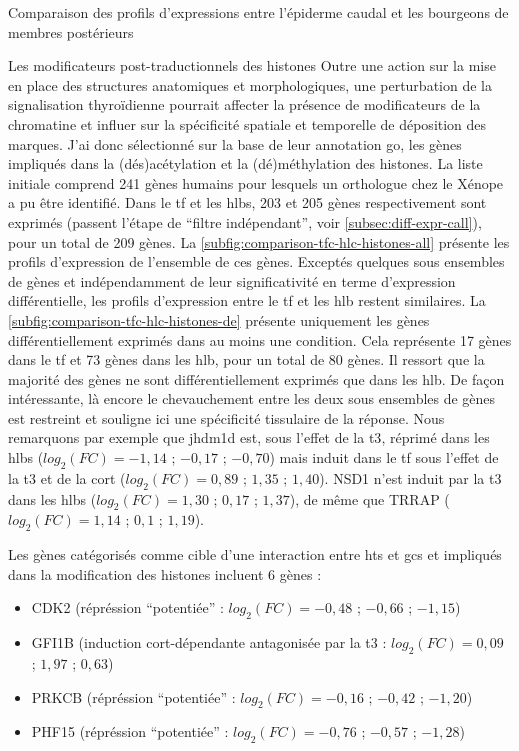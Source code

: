 \documentclass[../main.tex]{subfiles}
\begin{document}
\begin{chapter}{Comparaison des profils d'expressions entre l'épiderme caudal et les bourgeons de membres postérieurs}
\begin{section}{Les modificateurs post-traductionnels des histones}
Outre une action sur la mise en place des structures anatomiques et morphologiques, une perturbation de la signalisation thyroïdienne pourrait affecter la présence de modificateurs de la chromatine et influer sur la spécificité spatiale et temporelle de déposition des marques.
J'ai donc sélectionné sur la base de leur annotation \gls{go}, les gènes impliqués dans la (dés)acétylation et la (dé)méthylation des histones.
La liste initiale comprend 241 gènes humains pour lesquels un orthologue chez le Xénope a pu être identifié.
Dans le \gls{tf} et les \glspl{hlb}, 203 et 205 gènes respectivement sont exprimés (passent l'étape de ``filtre indépendant'', voir \autoref{subsec:diff-expr-call}), pour un total de 209 gènes.
La \autoref{subfig:comparison-tfc-hlc-histones-all} présente les profils d'expression de l'ensemble de ces gènes.
Exceptés quelques sous ensembles de gènes et indépendamment de leur significativité en terme d'expression différentielle, les profils d'expression entre le \gls{tf} et les \gls{hlb} restent similaires.
La \autoref{subfig:comparison-tfc-hlc-histones-de} présente uniquement les gènes différentiellement exprimés dans au moins une condition.
Cela représente 17 gènes dans le \gls{tf} et 73 gènes dans les \gls{hlb}, pour un total de 80 gènes.
Il ressort que la majorité des gènes ne sont différentiellement exprimés que dans les \gls{hlb}.
De façon intéressante, là encore le chevauchement entre les deux sous ensembles de gènes est restreint et souligne ici une spécificité tissulaire de la réponse.
Nous remarquons par exemple que \gls{jhdm1d} est, sous l'effet de la \gls{t3}, réprimé dans les \glspl{hlb} ($log_2(FC)=-1,14$ ; $-0,17$ ; $-0,70$) mais induit dans le \gls{tf} sous l'effet de la \gls{t3} et de la \gls{cort} ($log_2(FC)=0,89$ ; $1,35$ ; $1,40$).
NSD1 n'est induit par la \gls{t3} dans les \glspl{hlb} ($log_2(FC)=1,30$ ; $0,17$ ; $1,37$), de même que TRRAP ($log_2(FC)=1,14$ ; $0,1$ ; $1,19$).
\par
Les gènes catégorisés comme cible d'une interaction entre \glspl{ht} et \glspl{gc} et impliqués dans la modification des histones incluent 6 gènes :
\begin{itemize}
\item CDK2 (répréssion ``potentiée'' : $log_2(FC)=-0,48$ ; $-0,66$ ; $-1,15$)
\item GFI1B (induction \gls{cort}-dépendante antagonisée par la \gls{t3} : $log_2(FC)=0,09$ ; $1,97$ ; $0,63$)
\item PRKCB (répréssion ``potentiée'' : $log_2(FC)=-0,16$ ; $-0,42$ ; $-1,20$)
\item PHF15 (répréssion ``potentiée'' : $log_2(FC)=-0,76$ ; $-0,57$ ; $-1,28$)

\end{itemize}
\end{section}
\end{chapter}
\end{document}
